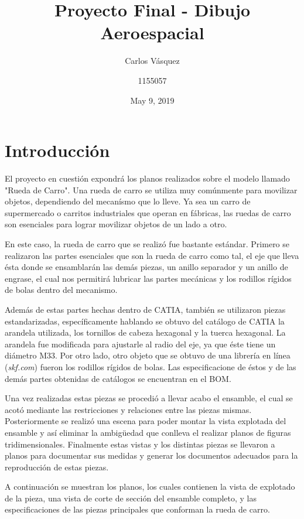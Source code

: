 \documentclass[12pt, letterpaper]{article}
\title{Proyecto Final - Dibujo Aeroespacial}
\author{Carlos Vásquez \and 1155057}
\date{May 9, 2019}
\begin{document}
\section*{Introducción}

El proyecto en cuestión expondrá los planos realizados sobre el modelo llamado "Rueda de Carro". Una rueda de carro se utiliza muy comúnmente para movilizar objetos, dependiendo del mecanísmo que lo lleve. Ya sea un carro de supermercado o carritos industriales que operan en fábricas, las ruedas de carro son esenciales para lograr movilizar objetos de un lado a otro.

En este caso, la rueda de carro que se realizó fue bastante estándar. Primero se realizaron las partes esenciales que son la rueda de carro como tal, el eje que lleva ésta donde se ensamblarán las demás piezas, un anillo separador y un anillo de engrase, el cual nos permitirá lubricar las partes mecánicas y los rodillos rígidos de bolas dentro del mecanismo.

Además de estas partes hechas dentro de CATIA, también se utilizaron piezas estandarizadas, específicamente hablando se obtuvo del catálogo de CATIA la arandela utilizada, los tornillos de cabeza hexagonal y la tuerca hexagonal. La arandela fue modificada para ajustarle al radio del eje, ya que éste tiene un diámetro M33. Por otro lado, otro objeto que se obtuvo de una librería en línea (\textit{skf.com}) fueron los rodillos rígidos de bolas. Las especificacione de éstos y de las demás partes obtenidas de catálogos se encuentran en el BOM.

Una vez realizadas estas piezas se procedió a llevar acabo el ensamble, el cual se acotó mediante las restricciones y relaciones entre las piezas mismas. Posteriormente se realizó una escena para poder montar la vista explotada del ensamble y así eliminar la ambigüedad que conlleva el realizar planos de figuras tridimensionales. Finalmente estas vistas y los distintas piezas se llevaron a planos para documentar sus medidas y generar los documentos adecuados para la reproducción de estas piezas.

A continuación se muestran los planos, los cuales contienen la vista de explotado de la pieza, una vista de corte de sección del ensamble completo, y las especificaciones de las piezas principales que conforman la rueda de carro.
\renewcommand\refname{Referencias}
\printbibliography
\end{document}
